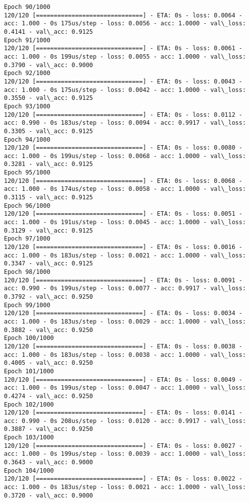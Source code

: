 \documentclass[11pt]{article}
\begin{document}
\begin{Verbatim}[commandchars=\\\{\}]
Epoch 90/1000
120/120 [==============================] - ETA: 0s - loss: 0.0064 - acc: 1.000 - 0s 175us/step - loss: 0.0056 - acc: 1.0000 - val\_loss: 0.4141 - val\_acc: 0.9125
Epoch 91/1000
120/120 [==============================] - ETA: 0s - loss: 0.0061 - acc: 1.000 - 0s 199us/step - loss: 0.0055 - acc: 1.0000 - val\_loss: 0.3790 - val\_acc: 0.9000
Epoch 92/1000
120/120 [==============================] - ETA: 0s - loss: 0.0043 - acc: 1.000 - 0s 175us/step - loss: 0.0042 - acc: 1.0000 - val\_loss: 0.3550 - val\_acc: 0.9125
Epoch 93/1000
120/120 [==============================] - ETA: 0s - loss: 0.0112 - acc: 0.990 - 0s 183us/step - loss: 0.0094 - acc: 0.9917 - val\_loss: 0.3305 - val\_acc: 0.9125
Epoch 94/1000
120/120 [==============================] - ETA: 0s - loss: 0.0080 - acc: 1.000 - 0s 199us/step - loss: 0.0068 - acc: 1.0000 - val\_loss: 0.3281 - val\_acc: 0.9125
Epoch 95/1000
120/120 [==============================] - ETA: 0s - loss: 0.0068 - acc: 1.000 - 0s 174us/step - loss: 0.0058 - acc: 1.0000 - val\_loss: 0.3115 - val\_acc: 0.9125
Epoch 96/1000
120/120 [==============================] - ETA: 0s - loss: 0.0051 - acc: 1.000 - 0s 191us/step - loss: 0.0045 - acc: 1.0000 - val\_loss: 0.3129 - val\_acc: 0.9125
Epoch 97/1000
120/120 [==============================] - ETA: 0s - loss: 0.0016 - acc: 1.000 - 0s 183us/step - loss: 0.0021 - acc: 1.0000 - val\_loss: 0.3347 - val\_acc: 0.9125
Epoch 98/1000
120/120 [==============================] - ETA: 0s - loss: 0.0091 - acc: 0.990 - 0s 199us/step - loss: 0.0077 - acc: 0.9917 - val\_loss: 0.3792 - val\_acc: 0.9250
Epoch 99/1000
120/120 [==============================] - ETA: 0s - loss: 0.0034 - acc: 1.000 - 0s 183us/step - loss: 0.0029 - acc: 1.0000 - val\_loss: 0.3882 - val\_acc: 0.9250
Epoch 100/1000
120/120 [==============================] - ETA: 0s - loss: 0.0038 - acc: 1.000 - 0s 183us/step - loss: 0.0038 - acc: 1.0000 - val\_loss: 0.4005 - val\_acc: 0.9250
Epoch 101/1000
120/120 [==============================] - ETA: 0s - loss: 0.0049 - acc: 1.000 - 0s 199us/step - loss: 0.0047 - acc: 1.0000 - val\_loss: 0.4274 - val\_acc: 0.9250
Epoch 102/1000
120/120 [==============================] - ETA: 0s - loss: 0.0141 - acc: 0.990 - 0s 208us/step - loss: 0.0120 - acc: 0.9917 - val\_loss: 0.3887 - val\_acc: 0.9250
Epoch 103/1000
120/120 [==============================] - ETA: 0s - loss: 0.0027 - acc: 1.000 - 0s 199us/step - loss: 0.0039 - acc: 1.0000 - val\_loss: 0.3643 - val\_acc: 0.9000
Epoch 104/1000
120/120 [==============================] - ETA: 0s - loss: 0.0022 - acc: 1.000 - 0s 183us/step - loss: 0.0021 - acc: 1.0000 - val\_loss: 0.3720 - val\_acc: 0.9000

\end{Verbatim}
\end{document}
